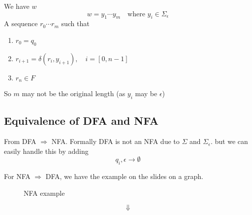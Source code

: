 \begin{theorem}
    We have $w$
    \[
        w = y_1\cdots y_m \quad \text{where } y_i \in \Sigma_{\epsilon}
    \]
    A sequence $r_0\cdots r_m$ such that
    \begin{enumerate}[label=(\arabic*)]
        \item $r_0 = q_0$
        \item $r_{i+1} = \delta(r_i, y_{i+1}),\quad i = [0, n-1]$
        \item $r_n \in F$
    \end{enumerate}
\end{theorem}

\begin{note}
    So $m$ may not be the original length (as $y_i$ may be $\epsilon$)
\end{note}

\subsection{Equivalence of DFA and NFA}

From DFA $\Rightarrow$ NFA. Formally DFA is not an NFA due to $\Sigma$ and $\Sigma_{\epsilon}$. but we can easily handle this by adding
\[
    q_i, \epsilon \rightarrow \emptyset
\]

For NFA $\Rightarrow$ DFA, we have the example on the slides on a graph.


\begin{figure}[H]
    \centering
    \caption{NFA example}
\end{figure}

\[
    \Downarrow
\]

